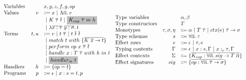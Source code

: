\documentclass[acmsmall]{acmart}
\newcommand{\graybox}[1]{\colorbox{lightgray}{$\displaystyle #1$}}
\newcommand{\vor}{~|~}
\newcommand{\ap}{~}
\newcommand{\ctx}[1]{ctx(#1)~}
\begin{document}
\begin{figure}
    \centering
    \begin{gather*}
        \begin{array}{lrll}
            \text{Variables} & & x, y, z, f, g, op \\
            \text{Values} &v &\Coloneqq x \vor \Lambda \overline{\alpha} \ldotp v \\
            &&\vor K\ap \overline{\tau} \ap \overline{t} \vor \graybox{K_{cap}\ap\overline{\tau}\ap m\ap h} \\
            &&\vor \lambda \overline{x : \tau}~\overline{y : \sigma}\ldotp t
            \\
            \text{Terms} &t, u &\Coloneqq v \vor t\ap\overline{\tau} \vor t \ap \overline{t} \ap \overline{t} \\
            &&\vor match ~ t ~ with ~\{\overline{K \ap \overline{x} \to t}\} \\
            &&\vor perform ~ op \ap x \ap \overline{\tau} \ap \overline{t} \\
            &&\vor handle ~ x : T \ap \overline{\tau} ~with ~h~in ~t \\
            &&\vor \graybox{handler_m ~ t}
            \\
            \text{Handlers} &h &\Coloneqq \{ \overline{op = t} \}
            \\
            \text{Programs} &p &\Coloneqq \epsilon \vor x : s = t, p
        \end{array}
        \begin{array}{lrl}
            \text{Type variables} && \alpha, \beta \\
            \text{Type constructors} && T \\
            \text{Monotypes} & \tau, \sigma, \eta &\Coloneqq \alpha \vor T \ap \overline{\tau} \vor \ctx{e} \overline{\tau} \to \sigma \\
            \text{Type schemas} & s &\Coloneqq \forall\overline{\alpha}\ldotp \tau \\
            \text{Effect rows} & e &\Coloneqq \epsilon\vor \tau, e \\
            \text{Typing contexts} & \Gamma &\Coloneqq \epsilon \vor x : s, \Gamma \vor x :_c \tau, \Gamma \\
            \text{Effect contexts} & \Sigma &\Coloneqq \{\overline{K_{cap} : \forall\overline{\alpha}\ldotp sig\to T\ap\overline{\alpha}}\} \\
            \text{Effect signatures} & sig &\Coloneqq \{\overline{op : \forall\overline{\alpha}\ldotp\overline{\tau}\to\sigma}\} \\

\end{array}
\end{gather*}
\end{figure}
\end{document}
